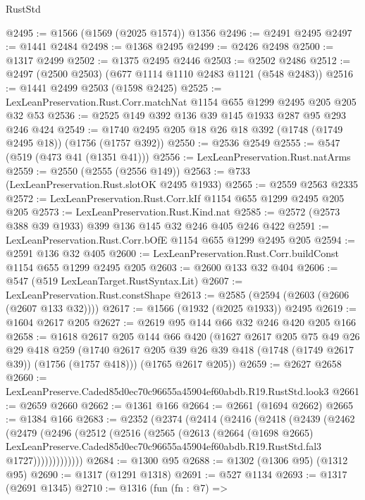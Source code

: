 \begin{lexlean}{RustStd}
\begin{coremodule}
@2495 := @1566 (@1569 (@2025 @1574)) @1356
@2496 := @2491 @2495
@2497 := @1441 @2484
@2498 := @1368 @2495
@2499 := @2426 @2498
@2500 := @1317 @2499
@2502 := @1375 @2495 @2446
@2503 := @2502 @2486
@2512 := @2497 (@2500 @2503) (@677 @1114 @1110 @2483 @1121 (@548 @2483))
@2516 := @1441 @2499 @2503 (@1598 @2425)
@2525 := LexLeanPreservation.Rust.Corr.matchNat @1154 @655 @1299 @2495 @205 @205 @32 @53
@2536 := @2525 @149 @392 @136 @39 @145 @1933 @287 @95 @293 @246 @424
@2549 := @1740 @2495 @205 @18 @26 @18 @392 (@1748 (@1749 @2495 @18)) (@1756 (@1757 @392))
@2550 := @2536 @2549
@2555 := @547 (@519 (@473 @41 (@1351 @41)))
@2556 := LexLeanPreservation.Rust.natArms
@2559 := @2550 (@2555 (@2556 @149))
@2563 := @733 (LexLeanPreservation.Rust.slotOK @2495 @1933)
@2565 := @2559 @2563 @2335
@2572 := LexLeanPreservation.Rust.Corr.kIf @1154 @655 @1299 @2495 @205 @205
@2573 := LexLeanPreservation.Rust.Kind.nat
@2585 := @2572 (@2573 @388 @39 @1933) @399 @136 @145 @32 @246 @405 @246 @422
@2591 := LexLeanPreservation.Rust.Corr.bOfE @1154 @655 @1299 @2495 @205
@2594 := @2591 @136 @32 @405
@2600 := LexLeanPreservation.Rust.Corr.buildConst @1154 @655 @1299 @2495 @205
@2603 := @2600 @133 @32 @404
@2606 := @547 (@519 LexLeanTarget.RustSyntax.Lit)
@2607 := LexLeanPreservation.Rust.constShape
@2613 := @2585 (@2594 (@2603 (@2606 (@2607 @133 @32))))
@2617 := @1566 (@1932 (@2025 @1933)) @2495
@2619 := @1604 @2617 @205
@2627 := @2619 @95 @144 @66 @32 @246 @420 @205 @166
@2658 := @1618
    @2617
    @205
    @144
    @66
    @420
    (@1627
      @2617
      @205
      @75
      @49
      @26
      @29
      @418
      @259
      (@1740 @2617 @205 @39 @26 @39 @418 (@1748 (@1749 @2617 @39)) (@1756 (@1757 @418)))
      (@1765 @2617 @205))
@2659 := @2627 @2658
@2660 := LexLeanPreserve.Caded85d0ec70c96655a45904ef60abdb.R19.RustStd.look3
@2661 := @2659 @2660
@2662 := @1361 @166
@2664 := @2661 (@1694 @2662)
@2665 := @1384 @166
@2683 := @2352
    (@2374
      (@2414
        (@2416
          (@2418
            (@2439
              (@2462
                (@2479
                  (@2496
                    (@2512
                      (@2516
                        (@2565
                          (@2613
                            (@2664
                              (@1698 @2665)
                              LexLeanPreserve.Caded85d0ec70c96655a45904ef60abdb.R19.RustStd.fal3
                              @1727)))))))))))))
@2684 := @1300 @95
@2688 := @1302 (@1306 @95) (@1312 @95)
@2690 := @1317 (@1291 @1318)
@2691 := @527 @1134
@2693 := @1317 (@2691 @1345)
@2710 := @1316
    (fun (fn : @7) =>

\end{coremodule}
\end{lexlean}
